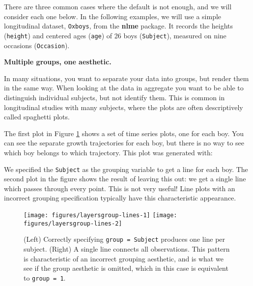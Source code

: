 There are three common cases where the default is not enough, and we
will consider each one below. In the following examples, we will use a
simple longitudinal dataset, \texttt{Oxboys}, from the \textbf{nlme}
package. It records the heights (\texttt{height}) and centered ages
(\texttt{age}) of 26 boys (\texttt{Subject}), measured on nine occasions
(\texttt{Occasion}). 

\textbf{Multiple groups, one aesthetic.}

In many situations, you want to separate your data into groups, but
render them in the same way. When looking at the data in aggregate you
want to be able to distinguish individual subjects, but not identify
them. This is common in longitudinal studies with many subjects, where
the plots are often descriptively called spaghetti plots.

The first plot in Figure \ref{fig:group-lines} shows a set of time
series plots, one for each boy. You can see the separate growth
trajectories for each boy, but there is no way to see which boy belongs
to which trajectory. This plot was generated with: 

\begin{Shaded}
\begin{Highlighting}[]
\StringTok{ } \StringTok{ }
\StringTok{  }\NormalTok{()}
\end{Highlighting}
\end{Shaded}

We specified the \texttt{Subject} as the grouping variable to get a line
for each boy. The second plot in the figure shows the result of leaving
this out: we get a single line which passes through every point. This is
not very useful! Line plots with an incorrect grouping specification
typically have this characteristic appearance. 

\begin{figure}

{\centering \texttt{[image: figures/layersgroup-lines-1]} \texttt{[image: figures/layersgroup-lines-2]} 

}

\caption{(Left) Correctly specifying {\tt group = Subject} produces one line per subject.  (Right) A single line connects all observations. This pattern is characteristic of an incorrect grouping aesthetic, and is what we see if the group aesthetic is omitted, which in this case is equivalent to {\tt group = 1}.\label{fig:group-lines}}
\end{figure}


